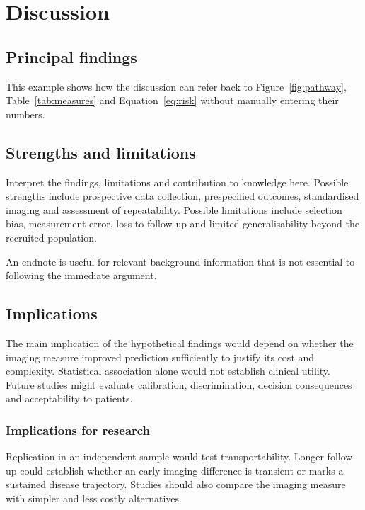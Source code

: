 \chapter{Discussion}

\section{Principal findings}
This example shows how the discussion can refer back to
Figure~\ref{fig:pathway}, Table~\ref{tab:measures} and
Equation~\ref{eq:risk} without manually entering their numbers.

\section{Strengths and limitations}
Interpret the findings, limitations and contribution to knowledge here.
Possible strengths include prospective data collection, prespecified outcomes,
standardised imaging and assessment of repeatability. Possible limitations
include selection bias, measurement error, loss to follow-up and limited
generalisability beyond the recruited population.

An endnote is useful for relevant background information that is not essential
to following the immediate argument.

\section{Implications}
The main implication of the hypothetical findings would depend on whether the
imaging measure improved prediction sufficiently to justify its cost and
complexity. Statistical association alone would not establish clinical utility.
Future studies might evaluate calibration, discrimination, decision consequences
and acceptability to patients.

\subsection{Implications for research}
Replication in an independent sample would test transportability. Longer
follow-up could establish whether an early imaging difference is transient or
marks a sustained disease trajectory. Studies should also compare the imaging
measure with simpler and less costly alternatives.

